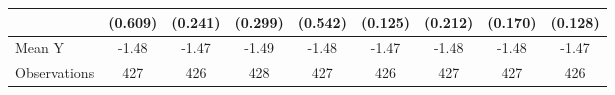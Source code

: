{\begin{tabular}{l*{8}{c}}
            &     (0.609)         &     (0.241)         &     (0.299)         &     (0.542)         &     (0.125)         &     (0.212)         &     (0.170)         &     (0.128)         \\
\midrule
Mean Y      &       -1.48         &       -1.47         &       -1.49         &       -1.48         &       -1.47         &       -1.48         &       -1.48         &       -1.47         \\
Observations&         427         &         426         &         428         &         427         &         426         &         427         &         427         &         426         \\
\bottomrule
\end{tabular}
}
